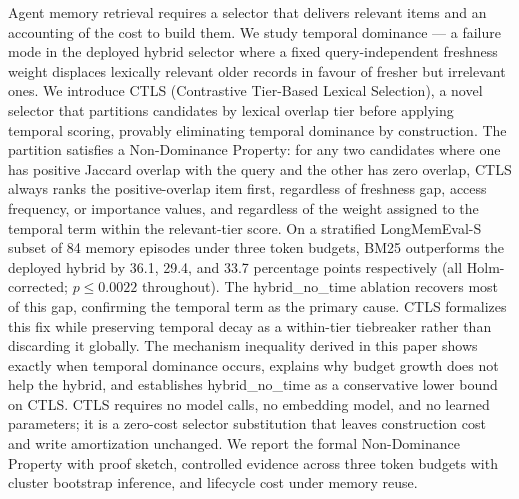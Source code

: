 Agent memory retrieval requires a selector that delivers relevant items and an
accounting of the cost to build them. We study temporal dominance --- a failure mode
in the deployed hybrid selector where a fixed query-independent freshness weight
displaces lexically relevant older records in favour of fresher but irrelevant ones.
We introduce CTLS (Contrastive Tier-Based Lexical Selection), a novel selector that
partitions candidates by lexical overlap tier before applying temporal scoring,
provably eliminating temporal dominance by construction. The partition satisfies a
Non-Dominance Property: for any two candidates where one has positive Jaccard overlap
with the query and the other has zero overlap, CTLS always ranks the positive-overlap
item first, regardless of freshness gap, access frequency, or importance values, and
regardless of the weight assigned to the temporal term within the relevant-tier score.
On a stratified LongMemEval-S subset of 84 memory episodes under three token budgets,
BM25 outperforms the deployed hybrid by 36.1, 29.4, and 33.7 percentage points
respectively (all Holm-corrected; $p \le 0.0022$ throughout). The hybrid\_no\_time
ablation recovers most of this gap, confirming the temporal term as the primary cause.
CTLS formalizes this fix while preserving temporal decay as a within-tier tiebreaker
rather than discarding it globally. The mechanism inequality derived in this paper
shows exactly when temporal dominance occurs, explains why budget growth does not help
the hybrid, and establishes hybrid\_no\_time as a conservative lower bound on CTLS.
CTLS requires no model calls, no embedding model, and no learned parameters; it is a
zero-cost selector substitution that leaves construction cost and write amortization
unchanged. We report the formal Non-Dominance Property with proof sketch, controlled
evidence across three token budgets with cluster bootstrap inference, and lifecycle
cost under memory reuse.

